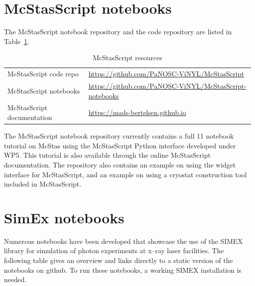 \documentclass[10pt]{scrartcl}
\begin{document}
\section{McStasScript notebooks}
\label{sec:mcstas}
The McStasScript notebook repository and the code repository are listed
in Table~\ref{tab:mcstasscript_resources}.
\begin{table}[ht]
  \centering
  \caption{McStasScript resources}
  \begin{center}
    \begin{tabular}{ll}
      \hline
      McStasScript code repo  & \url{https://github.com/PaNOSC-ViNYL/McStasScript} \\ 
      McStasScript notebooks & \url{https://github.com/PaNOSC-ViNYL/McStasScript-notebooks} \\  
      McStasScript documentation & \url{https://mads-bertelsen.github.io}\\
      \hline
    \end{tabular}
  \end{center}
  \label{tab:mcstasscript_resources}
\end{table}
The McStasScript notebook repository currently contains a full 11 notebook
tutorial on McStas using the McStasScript Python interface developed under WP5.
This tutorial is also available through the online McStasScript documentation.
The repository also contains an example on using the widget interface for
McStasScript, and an example on using a cryostat construction tool included in
McStasScript.

\section{SimEx notebooks}
\label{sec:simex}
Numerous notebooks have been developed that showcase the use of the SIMEX
library for simulation of photon experiments at x--ray laser facilities. The
following table gives an overview and links directly to a static version of the
notebooks on github. 
To run these notebooks, a working SIMEX installation is needed.
\end{document}
